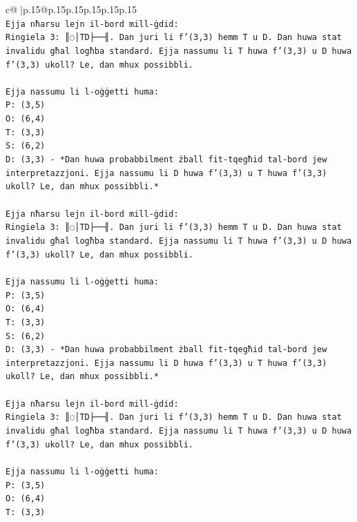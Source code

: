 \documentclass{article}
\begin{document}
{\begin{supertabular}{c@{$\;$}|p{.15\linewidth}@{}p{.15\linewidth}p{.15\linewidth}p{.15\linewidth}p{.15\linewidth}p{.15\linewidth}}
{{{\\ 
\texttt{Ejja nħarsu lejn il{-}bord mill{-}ġdid:} \\
\texttt{Ringiela 3: ║◌│TD├──╢. Dan juri li f'(3,3) hemm T u D. Dan huwa stat invalidu għal logħba standard. Ejja nassumu li T huwa f'(3,3) u D huwa f'(3,3) ukoll? Le, dan mhux possibbli.} \\
\\ 
\texttt{Ejja nassumu li l{-}oġġetti huma:} \\
\texttt{P: (3,5)} \\
\texttt{O: (6,4)} \\
\texttt{T: (3,3)} \\
\texttt{S: (6,2)} \\
\texttt{D: (3,3) {-} *Dan huwa probabbilment żball fit{-}tqegħid tal{-}bord jew interpretazzjoni. Ejja nassumu li D huwa f'(3,3) u T huwa f'(3,3) ukoll? Le, dan mhux possibbli.*} \\
\\ 
\texttt{Ejja nħarsu lejn il{-}bord mill{-}ġdid:} \\
\texttt{Ringiela 3: ║◌│TD├──╢. Dan juri li f'(3,3) hemm T u D. Dan huwa stat invalidu għal logħba standard. Ejja nassumu li T huwa f'(3,3) u D huwa f'(3,3) ukoll? Le, dan mhux possibbli.} \\
\\ 
\texttt{Ejja nassumu li l{-}oġġetti huma:} \\
\texttt{P: (3,5)} \\
\texttt{O: (6,4)} \\
\texttt{T: (3,3)} \\
\texttt{S: (6,2)} \\
\texttt{D: (3,3) {-} *Dan huwa probabbilment żball fit{-}tqegħid tal{-}bord jew interpretazzjoni. Ejja nassumu li D huwa f'(3,3) u T huwa f'(3,3) ukoll? Le, dan mhux possibbli.*} \\
\\ 
\texttt{Ejja nħarsu lejn il{-}bord mill{-}ġdid:} \\
\texttt{Ringiela 3: ║◌│TD├──╢. Dan juri li f'(3,3) hemm T u D. Dan huwa stat invalidu għal logħba standard. Ejja nassumu li T huwa f'(3,3) u D huwa f'(3,3) ukoll? Le, dan mhux possibbli.} \\
\\ 
\texttt{Ejja nassumu li l{-}oġġetti huma:} \\
\texttt{P: (3,5)} \\
\texttt{O: (6,4)} \\
\texttt{T: (3,3)} \\
}}}
\end{supertabular}}
\end{document}
